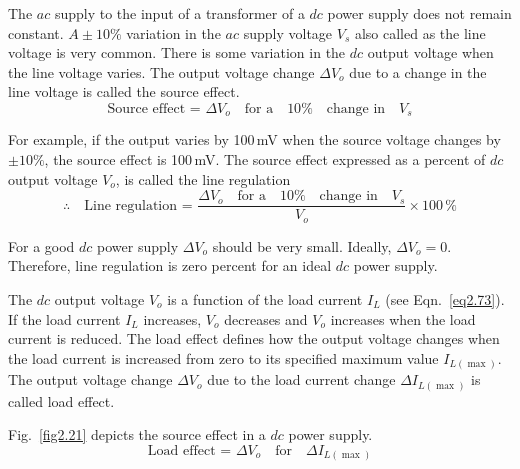 The $ac$ supply to the input of a transformer of a $dc$ power supply does not remain constant. $A\pm 10\%$ variation in the $ac$ supply voltage $V_{s}$ also called as the line voltage is very common. There is some variation in the $dc$ output voltage when the line voltage varies. The output voltage change $\Delta V_{o}$ due to a change in the line voltage is called the source effect.
\begin{equation}
\text{Source effect = } \Delta V_{o}\text{~~ for a~~ } 10\%\text{~~ change in~~ } V_{s}\label{eq2.74}  
\end{equation}

For example, if the output varies by 100\,mV when the source voltage changes by $\pm 10\%$, the source effect is 100\,mV. The source effect expressed as a percent of $dc$ output voltage $V_{o}$, is called the line regulation
\begin{equation}
\therefore\quad \text{Line regulation = } \dfrac{\Delta V_{o}\text{~~ for a~~ } 10\%\text{~~ change in~~ }V_{s}}{V_{o}}\times 100\,\%\label{eq2.75}
\end{equation}

For a good $dc$ power supply $\Delta V_{o}$ should be very small. Ideally, $\Delta V_{o}=0$. Therefore, line regulation is zero percent for an ideal $dc$ power supply.

\medskip
{}
The $dc$ output voltage $V_{o}$ is a function of the load current $I_{L}$ (see Eqn.~\eqref{eq2.73}). If the load current $I_{L}$ increases, $V_{o}$ decreases and $V_{o}$ increases when the load current is reduced. The load effect defines how the output voltage changes when the load current is increased from zero to its specified maximum value $I_{L(\max)}$. The output voltage change $\Delta V_{o}$ due to the load current change $\Delta I_{L(\max)}$ is called load effect.

Fig.~\ref{fig2.21} depicts the source effect in a $dc$ power supply.
\begin{equation}
\text{Load effect = } \Delta V_{o}\text{~~ for~~ } \Delta I_{L(\max)}\label{eq2.76}
\end{equation}

